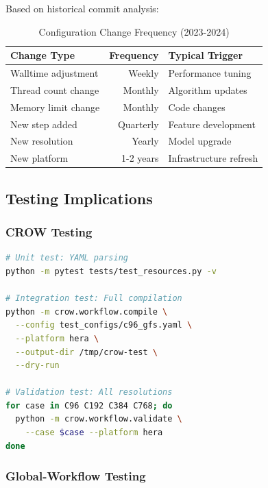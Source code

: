 \documentclass[11pt,twoside]{article}
\newcommand{\crow}{\textsc{CROW}}
\begin{document}
Based on historical commit analysis:

\begin{table}[H]
\centering
\caption{Configuration Change Frequency (2023-2024)}
\label{tab:change-freq}
\begin{tabular}{@{}lrl@{}}
\toprule
\textbf{Change Type} & \textbf{Frequency} & \textbf{Typical Trigger} \\
\midrule
Walltime adjustment & Weekly & Performance tuning \\
Thread count change & Monthly & Algorithm updates \\
Memory limit change & Monthly & Code changes \\
New step added & Quarterly & Feature development \\
New resolution & Yearly & Model upgrade \\
New platform & 1-2 years & Infrastructure refresh \\
\bottomrule
\end{tabular}
\end{table}

\subsection{Testing Implications}

\subsubsection{CROW Testing}

\begin{lstlisting}[language=Bash, caption={\crow{} Test Patterns}]
# Unit test: YAML parsing
python -m pytest tests/test_resources.py -v

# Integration test: Full compilation
python -m crow.workflow.compile \
  --config test_configs/c96_gfs.yaml \
  --platform hera \
  --output-dir /tmp/crow-test \
  --dry-run

# Validation test: All resolutions
for case in C96 C192 C384 C768; do
  python -m crow.workflow.validate \
    --case $case --platform hera
done
\end{lstlisting}

\subsubsection{Global-Workflow Testing}
\end{document}
